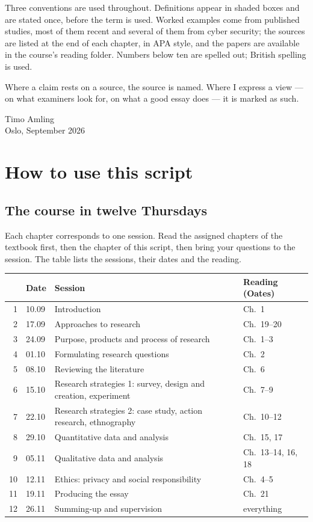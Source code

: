 \documentclass[11pt,a4paper,british,twoside=false,headings=small,chapterprefix=false,numbers=noenddot]{scrbook}
\begin{document}
Three conventions are used throughout. Definitions appear in shaded boxes and are stated once, before the term is used. Worked examples come from published studies, most of them recent and several of them from cyber security; the sources are listed at the end of each chapter, in APA style, and the papers are available in the course's reading folder. Numbers below ten are spelled out; British spelling is used.

Where a claim rests on a source, the source is named. Where I express a view --- on what examiners look for, on what a good essay does --- it is marked as such.

\medskip\noindent Timo Amling\\ Oslo, September 2026


\chapter*{How to use this script}

\section*{The course in twelve Thursdays}

Each chapter corresponds to one session. Read the assigned chapters of the textbook first, then the chapter of this script, then bring your questions to the session. The table lists the sessions, their dates and the reading.

\begin{center}\small
\renewcommand{\arraystretch}{1.15}
\begin{tabular}{@{}rlll@{}}
\toprule
& \textbf{Date} & \textbf{Session} & \textbf{Reading (Oates)}\\
\midrule
1 & 10.09 & Introduction & Ch.\ 1\\
2 & 17.09 & Approaches to research & Ch.\ 19--20\\
3 & 24.09 & Purpose, products and process of research & Ch.\ 1--3\\
4 & 01.10 & Formulating research questions & Ch.\ 2\\
5 & 08.10 & Reviewing the literature & Ch.\ 6\\
6 & 15.10 & Research strategies 1: survey, design and creation, experiment & Ch.\ 7--9\\
7 & 22.10 & Research strategies 2: case study, action research, ethnography & Ch.\ 10--12\\
8 & 29.10 & Quantitative data and analysis & Ch.\ 15, 17\\
9 & 05.11 & Qualitative data and analysis & Ch.\ 13--14, 16, 18\\
10 & 12.11 & Ethics: privacy and social responsibility & Ch.\ 4--5\\
11 & 19.11 & Producing the essay & Ch.\ 21\\
12 & 26.11 & Summing-up and supervision & everything\\
\bottomrule
\end{tabular}
\end{center}
\end{document}
